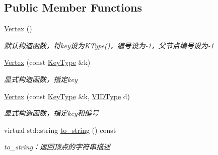 \subsection*{Public Member Functions}
\begin{DoxyCompactItemize}
\item 
\hyperlink{struct_introdunction_to_algorithm_1_1_graph_algorithm_1_1_vertex_ac4aef8b9a11955883ec6f3d3d80d0c8d}{Vertex} ()
\begin{DoxyCompactList}\small\item\em 默认构造函数，将{\ttfamily key}设为{\ttfamily K\+Type()}，编号设为-\/1，父节点编号设为-\/1 \end{DoxyCompactList}\item 
\hyperlink{struct_introdunction_to_algorithm_1_1_graph_algorithm_1_1_vertex_a76a188bd466091ab24db73b66552a2cc}{Vertex} (const \hyperlink{struct_introdunction_to_algorithm_1_1_graph_algorithm_1_1_vertex_ada86f69d9e5f5dcb47b7be1e3a208d06}{Key\+Type} \&k)
\begin{DoxyCompactList}\small\item\em 显式构造函数，指定{\ttfamily key} \end{DoxyCompactList}\item 
\hyperlink{struct_introdunction_to_algorithm_1_1_graph_algorithm_1_1_vertex_a393cb4699ee313b284fe55e036563d5e}{Vertex} (const \hyperlink{struct_introdunction_to_algorithm_1_1_graph_algorithm_1_1_vertex_ada86f69d9e5f5dcb47b7be1e3a208d06}{Key\+Type} \&k, \hyperlink{struct_introdunction_to_algorithm_1_1_graph_algorithm_1_1_vertex_ac1913974a4b8371c5a896b098ebf152e}{V\+I\+D\+Type} d)
\begin{DoxyCompactList}\small\item\em 显式构造函数，指定{\ttfamily key}和编号 \end{DoxyCompactList}\item 
virtual std\+::string \hyperlink{struct_introdunction_to_algorithm_1_1_graph_algorithm_1_1_vertex_a982554041f07fc2aaf067fa7e10928b2}{to\+\_\+string} () const 
\begin{DoxyCompactList}\small\item\em to\+\_\+string：返回顶点的字符串描述 \end{DoxyCompactList}\end{DoxyCompactItemize}
